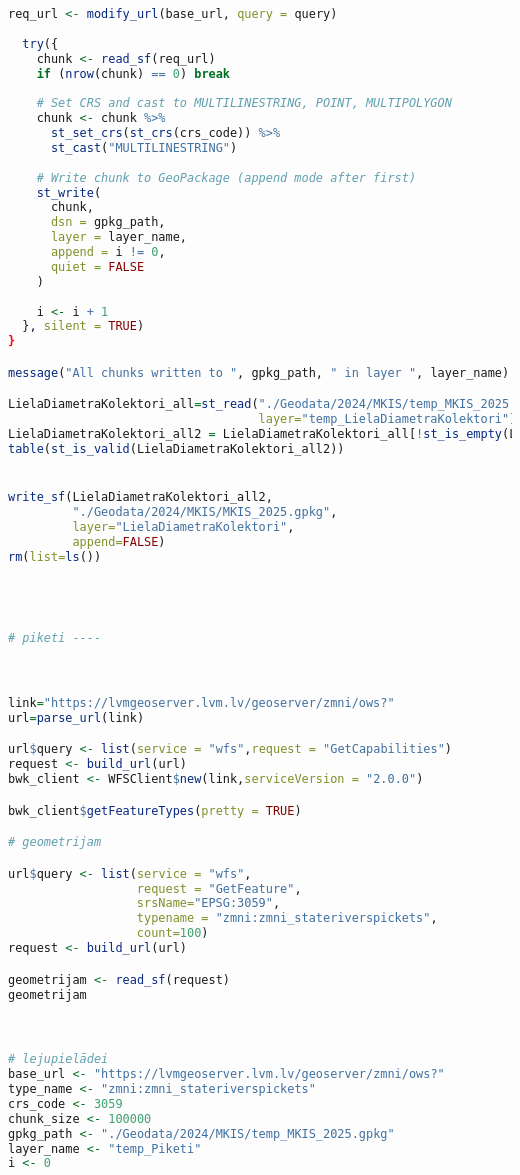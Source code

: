\documentclass[
]{book}
\begin{document}
\begin{lstlisting}[language=R]
  req_url <- modify_url(base_url, query = query)
  
  try({
    chunk <- read_sf(req_url)
    if (nrow(chunk) == 0) break
    
    # Set CRS and cast to MULTILINESTRING, POINT, MULTIPOLYGON
    chunk <- chunk %>%
      st_set_crs(st_crs(crs_code)) %>%
      st_cast("MULTILINESTRING")
    
    # Write chunk to GeoPackage (append mode after first)
    st_write(
      chunk, 
      dsn = gpkg_path,
      layer = layer_name,
      append = i != 0,
      quiet = FALSE
    )
    
    i <- i + 1
  }, silent = TRUE)
}

message("All chunks written to ", gpkg_path, " in layer ", layer_name)

LielaDiametraKolektori_all=st_read("./Geodata/2024/MKIS/temp_MKIS_2025.gpkg",
                                   layer="temp_LielaDiametraKolektori")
LielaDiametraKolektori_all2 = LielaDiametraKolektori_all[!st_is_empty(LielaDiametraKolektori_all),,drop=FALSE] # 0
table(st_is_valid(LielaDiametraKolektori_all2))


write_sf(LielaDiametraKolektori_all2,
         "./Geodata/2024/MKIS/MKIS_2025.gpkg",
         layer="LielaDiametraKolektori",
         append=FALSE)
rm(list=ls())




# piketi ----



link="https://lvmgeoserver.lvm.lv/geoserver/zmni/ows?"
url=parse_url(link)

url$query <- list(service = "wfs",request = "GetCapabilities")
request <- build_url(url)
bwk_client <- WFSClient$new(link,serviceVersion = "2.0.0")

bwk_client$getFeatureTypes(pretty = TRUE)

# geometrijam

url$query <- list(service = "wfs",
                  request = "GetFeature",
                  srsName="EPSG:3059",
                  typename = "zmni:zmni_stateriverspickets",
                  count=100)
request <- build_url(url)

geometrijam <- read_sf(request)
geometrijam



# lejupielādei
base_url <- "https://lvmgeoserver.lvm.lv/geoserver/zmni/ows?"
type_name <- "zmni:zmni_stateriverspickets"
crs_code <- 3059
chunk_size <- 100000
gpkg_path <- "./Geodata/2024/MKIS/temp_MKIS_2025.gpkg"
layer_name <- "temp_Piketi"
i <- 0


\end{lstlisting}
\end{document}
